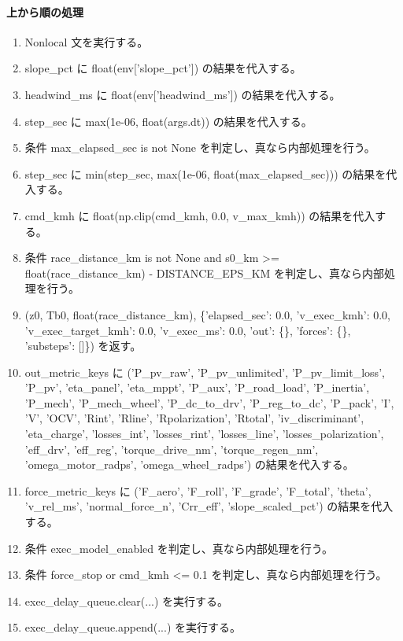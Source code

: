 \documentclass[a4paper,11pt]{article}
\begin{document}
            \paragraph{上から順の処理}
            \begin{enumerate}[leftmargin=1.8em]
            \item Nonlocal 文を実行する。
\item slope\_pct に float(env['slope\_pct']) の結果を代入する。
\item headwind\_ms に float(env['headwind\_ms']) の結果を代入する。
\item step\_sec に max(1e-06, float(args.dt)) の結果を代入する。
\item 条件 max\_elapsed\_sec is not None を判定し、真なら内部処理を行う。
\item   step\_sec に min(step\_sec, max(1e-06, float(max\_elapsed\_sec))) の結果を代入する。
\item cmd\_kmh に float(np.clip(cmd\_kmh, 0.0, v\_max\_kmh)) の結果を代入する。
\item 条件 race\_distance\_km is not None and s0\_km >= float(race\_distance\_km) - DISTANCE\_EPS\_KM を判定し、真なら内部処理を行う。
\item   (z0, Tb0, float(race\_distance\_km), \{'elapsed\_sec': 0.0, 'v\_exec\_kmh': 0.0, 'v\_exec\_target\_kmh': 0.0, 'v\_exec\_ms': 0.0, 'out': \{\}, 'forces': \{\}, 'substeps': []\}) を返す。
\item out\_metric\_keys に ('P\_pv\_raw', 'P\_pv\_unlimited', 'P\_pv\_limit\_loss', 'P\_pv', 'eta\_panel', 'eta\_mppt', 'P\_aux', 'P\_road\_load', 'P\_inertia', 'P\_mech', 'P\_mech\_wheel', 'P\_dc\_to\_drv', 'P\_reg\_to\_dc', 'P\_pack', 'I', 'V', 'OCV', 'Rint', 'Rline', 'Rpolarization', 'Rtotal', 'iv\_discriminant', 'eta\_charge', 'losses\_int', 'losses\_rint', 'losses\_line', 'losses\_polarization', 'eff\_drv', 'eff\_reg', 'torque\_drive\_nm', 'torque\_regen\_nm', 'omega\_motor\_radps', 'omega\_wheel\_radps') の結果を代入する。
\item force\_metric\_keys に ('F\_aero', 'F\_roll', 'F\_grade', 'F\_total', 'theta', 'v\_rel\_ms', 'normal\_force\_n', 'Crr\_eff', 'slope\_scaled\_pct') の結果を代入する。
\item 条件 exec\_model\_enabled を判定し、真なら内部処理を行う。
\item   条件 force\_stop or cmd\_kmh <= 0.1 を判定し、真なら内部処理を行う。
\item     exec\_delay\_queue.clear(...) を実行する。
\item     exec\_delay\_queue.append(...) を実行する。

\end{enumerate}
\end{document}
